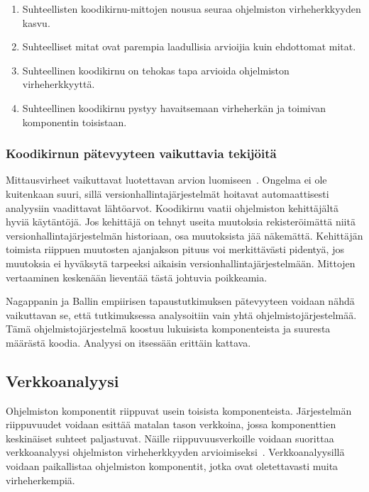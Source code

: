 \documentclass[finnish]{../tktltiki2}
\theoremstyle{definition}
\theoremstyle{remark}
\begin{document}
\begin{enumerate}

    \item Suhteellisten koodikirnu-mittojen nousua seuraa ohjelmiston virheherkkyyden kasvu.

    \item Suhteelliset mitat ovat parempia laadullisia arvioijia kuin ehdottomat mitat.

    \item Suhteellinen koodikirnu on tehokas tapa arvioida ohjelmiston virheherkkyyttä.

    \item Suhteellinen koodikirnu pystyy havaitsemaan virheherkän ja toimivan komponentin toisistaan.

\end{enumerate}

\subsubsection{Koodikirnun pätevyyteen vaikuttavia tekijöitä}

Mittausvirheet vaikuttavat luotettavan arvion luomiseen~\cite{NB05}. Ongelma ei ole kuitenkaan suuri, sillä 
versionhallintajärjestelmät hoitavat automaattisesti analyysiin vaadittavat lähtöarvot. Koodikirnu vaatii ohjelmiston 
kehittäjältä hyviä käytäntöjä. Jos kehittäjä on tehnyt useita muutoksia rekisteröimättä niitä 
versionhallintajärjestelmän historiaan, osa muutoksista jää näkemättä. Kehittäjän toimista riippuen muutosten ajanjakson 
pituus voi merkittävästi pidentyä, jos muutoksia ei hyväksytä tarpeeksi aikaisin versionhallintajärjestelmään. Mittojen 
vertaaminen keskenään lieventää tästä johtuvia poikkeamia.

    Nagappanin ja Ballin empiirisen tapaustutkimuksen pätevyyteen voidaan nähdä vaikuttavan se, että tutkimuksessa 
analysoitiin vain yhtä ohjelmistojärjestelmää. Tämä ohjelmistojärjestelmä koostuu lukuisista komponenteista ja suuresta 
määrästä koodia. Analyysi on itsessään erittäin kattava.

\subsection{Verkkoanalyysi}

Ohjelmiston komponentit riippuvat usein toisista komponenteista. Järjes\-telmän riippuvuudet voidaan esittää matalan 
tason verkkoina, jossa komponenttien keskinäiset suhteet paljastuvat. Näille riippuvuusverkoille voidaan suorittaa 
verkkoanalyysi ohjelmiston virheherkkyyden arvioimiseksi~\cite{ZN08}. Verkkoanalyysillä voidaan paikallistaa ohjelmiston 
komponentit, jotka ovat oletettavasti muita virheherkempiä.
\end{document}
